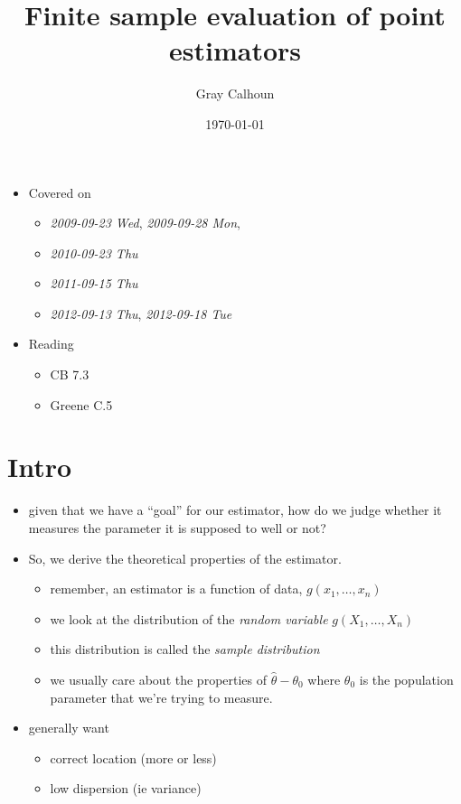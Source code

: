 \documentclass[11pt]{article}
\title{Finite sample evaluation of point estimators}
\author{Gray Calhoun}
\date{\today}
\begin{document}
\maketitle

\setcounter{tocdepth}{2}
\tableofcontents
\vspace*{1cm}
\begin{itemize}
\item Covered on
\begin{itemize}
\item \textit{2009-09-23 Wed}, \textit{2009-09-28 Mon},
\item \textit{2010-09-23 Thu}
\item \textit{2011-09-15 Thu}
\item \textit{2012-09-13 Thu}, \textit{2012-09-18 Tue}
\end{itemize}
\item Reading
\begin{itemize}
\item CB 7.3
\item Greene C.5
\end{itemize}
\end{itemize}
\section{Intro}
\label{sec-1}

\begin{itemize}
\item given that we have a ``goal'' for our estimator, how do we judge
     whether it measures the parameter it is supposed to well or not?
\item So, we derive the theoretical properties of the estimator.
\begin{itemize}
\item remember, an estimator is a function of data, $g(x_1,\dots,x_n)$
\item we look at the distribution of the \emph{random variable} $g(X_1,\dots,X_n)$
\item this distribution is called the \emph{sample distribution}
\item we usually care about the properties of $\hat \theta -
       \theta_0$ where $\theta_0$ is the population parameter that
       we're trying to measure.
\end{itemize}
\item generally want
\begin{itemize}
\item correct location (more or less)
\item low dispersion (ie variance)
\end{itemize}
\end{itemize}
\end{document}
